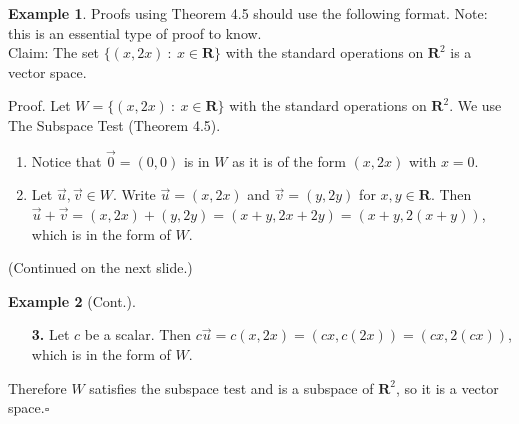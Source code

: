 \documentclass{beamer}
\newcommand{\R}{\mathbf{R}}
\newcommand{\fn}{\insertframenumber}
\theoremstyle{definition}
\newtheorem*{exa}{Example}
\begin{document}
\begin{frame}{\fn}
	\begin{exa}
		Proofs using Theorem 4.5 should use the following format.  Note: this is an essential type of proof to know.\\
		Claim: The set $\{(x,2x)\ :\ x\in\R\}$ with the standard operations on $\R^2$ is a vector space. 
		\begin{block}{Proof.}
			Let $W=\{(x,2x)\ :\ x\in\R\}$ with the standard operations on $\R^2$. We use The Subspace Test (Theorem 4.5).
			\begin{enumerate}[label=\textbf{\arabic*.}]
				\item Notice that $\vec0 =(0,0)$ is in $W$ as it is of the form $(x,2x)$ with $x=0$.
				\item Let $\vec u,\vec v\in W$.  Write $\vec u=(x,2x)$ and $\vec v=(y,2y)$ for $x,y\in\R$.  Then $\vec u+\vec v=(x,2x)+(y,2y)=(x+y,2x+2y)=(x+y,2(x+y))$, which is in the form of $W$.
			\end{enumerate}
		\end{block}
	\end{exa}
	(Continued on the next slide.)
\end{frame}
\begin{frame}{\fn}
	\begin{exa}[Cont.]
		\begin{block}{}
			\begin{enumerate}[label=\textbf{\arabic*.}]
				\item[\textbf{3.}] Let $c$ be a scalar. Then $c\vec u=c(x,2x)=(cx,c(2x))=(cx,2(cx))$, which is in the form of $W$.
			\end{enumerate}
			Therefore $W$ satisfies the subspace test and is a subspace of $\R^2$, so it is a vector space.\hfill$\square$
		\end{block}
	\end{exa}
\end{frame}
\end{document}
